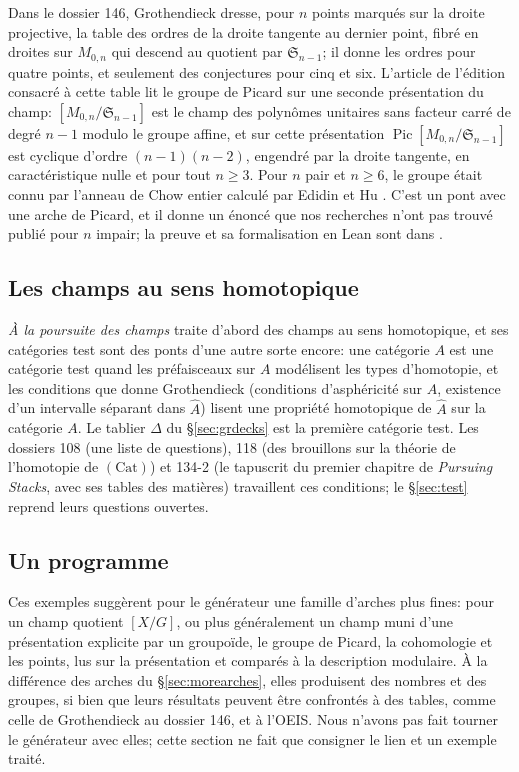 Dans le dossier 146, Grothendieck dresse, pour $n$ points marqués sur la droite projective, la table des ordres de la droite tangente au dernier point, fibré en droites sur $M_{0,n}$ qui descend au quotient par $\mathfrak S_{n-1}$; il donne les ordres pour quatre points, et seulement des conjectures pour cinq et six. L'article de l'édition consacré à cette table \cite{hua-tangent} lit le groupe de Picard sur une seconde présentation du champ: $[M_{0,n}/\mathfrak S_{n-1}]$ est le champ des polynômes unitaires sans facteur carré de degré $n-1$ modulo le groupe affine, et sur cette présentation $\operatorname{Pic}[M_{0,n}/\mathfrak S_{n-1}]$ est cyclique d'ordre $(n-1)(n-2)$, engendré par la droite tangente, en caractéristique nulle et pour tout $n\ge3$. Pour $n$ pair et $n\ge6$, le groupe était connu par l'anneau de Chow entier calculé par Edidin et Hu \cite{edidin-hu}. C'est un pont avec une arche de Picard, et il donne un énoncé que nos recherches n'ont pas trouvé publié pour $n$ impair; la preuve et sa formalisation en Lean sont dans \cite{hua-tangent}.

\subsection{Les champs au sens homotopique}

\emph{À la poursuite des champs} \cite{maltsiniotis} traite d'abord des champs au sens homotopique, et ses catégories test sont des ponts d'une autre sorte encore: une catégorie $A$ est une catégorie test quand les préfaisceaux sur $A$ modélisent les types d'homotopie, et les conditions que donne Grothendieck (conditions d'asphéricité sur $A$, existence d'un intervalle séparant dans $\widehat A$) lisent une propriété homotopique de $\widehat A$ sur la catégorie $A$. Le tablier $\Delta$ du \S\ref{sec:grdecks} est la première catégorie test. Les dossiers 108 (une liste de questions), 118 (des brouillons sur la théorie de l'homotopie de $(\mathrm{Cat})$) et 134-2 (le tapuscrit du premier chapitre de \emph{Pursuing Stacks}, avec ses tables des matières) travaillent ces conditions; le \S\ref{sec:test} reprend leurs questions ouvertes.

\subsection{Un programme}

Ces exemples suggèrent pour le générateur une famille d'arches plus fines: pour un champ quotient $[X/G]$, ou plus généralement un champ muni d'une présentation explicite par un groupoïde, le groupe de Picard, la cohomologie et les points, lus sur la présentation et comparés à la description modulaire. À la différence des arches du \S\ref{sec:morearches}, elles produisent des nombres et des groupes, si bien que leurs résultats peuvent être confrontés à des tables, comme celle de Grothendieck au dossier 146, et à l'OEIS. Nous n'avons pas fait tourner le générateur avec elles; cette section ne fait que consigner le lien et un exemple traité.
